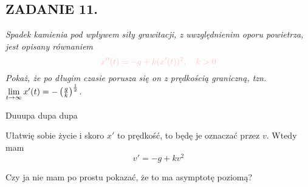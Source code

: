 \documentclass{article}
\begin{document}
\subsection*{ZADANIE 11.}
\emph{\color{pink}Spadek kamienia pod wpływem siły grawitacji, z uwzględnienim oporu powietrza, jest opisany równaniem}
$$\color{pink}x''(t)=-g+k(x'(t))^2,\quad k>0$$
\emph{\color{pink}Pokaż, że po długim czasie porusza się on z prędkością graniczną, tzn. $\lim\limits_{t\to\infty}x'(t)=-\left({g\over k}\right)^\frac12$.}
\smallskip

Duuupa dupa dupa

Ułatwię sobie życie i skoro $x'$ to prędkość, to będę je oznaczać przez $v$. Wtedy mam
$$v'=-g+kv^2$$

Czy ja nie mam po prostu pokazać, że to ma asymptotę poziomą?


\end{document}

